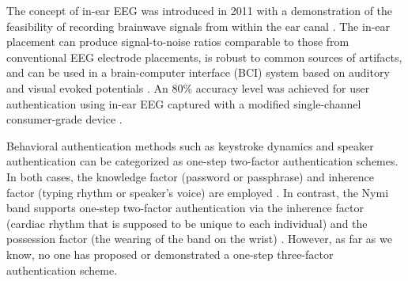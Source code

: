 \documentclass{sigchi-ext}
\begin{document}
The concept of in-ear EEG was introduced in 2011 with a demonstration of the feasibility of recording brainwave signals from within the ear canal \cite{Looney2011}. The in-ear placement can produce signal-to-noise ratios comparable to those from conventional EEG electrode placements, is robust to common sources of artifacts, and can be used in a brain-computer interface (BCI) system based on auditory and visual evoked potentials \cite{Kidmose2013a}. An 80\% accuracy level was achieved for user authentication using in-ear EEG captured with a modified single-channel consumer-grade device \cite{curran2016passthoughts}.

Behavioral authentication methods such as keystroke dynamics and speaker authentication can be categorized as one-step two-factor authentication schemes. In both cases, the knowledge factor (password or passphrase) and inherence factor (typing rhythm or speaker's voice) are employed \cite{Monrose1997}. In contrast, the Nymi band supports one-step two-factor authentication via the inherence factor (cardiac rhythm that is supposed to be unique to each individual) and the possession factor (the wearing of the band on the wrist) \cite{Nymi}. However, as far as we know, no one has proposed or demonstrated a one-step three-factor authentication scheme.


\end{document}
